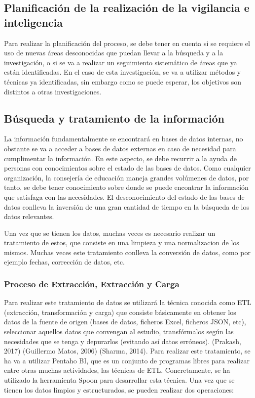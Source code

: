 \subsection{Planificación de la realización de la vigilancia e inteligencia}
Para realizar la planificación del proceso, se debe tener en cuenta si se requiere el uso de nuevas áreas desconocidas que puedan llevar a la búsqueda y a la investigación, o si se va a realizar un seguimiento sistemático de áreas que ya están identificadas. En el caso de esta investigación, se va a utilizar métodos y técnicas ya identificadas, sin embargo como se puede esperar, los objetivos son distintos a otras investigaciones.


\subsection{Búsqueda y tratamiento de la información}

La información fundamentalmente se encontrará en bases de datos internas, no obstante se va a acceder a bases de datos externas en caso de necesidad para cumplimentar la información. En este aspecto, se debe recurrir a la ayuda de personas con conocimientos sobre el estado de las bases de datos. Como cualquier organización, la consejería de educación maneja grandes volúmenes de datos, por tanto, se debe tener conocimiento sobre donde se puede encontrar la información que satisfaga con las necesidades. 
El desconocimiento del estado de las bases de datos conlleva la inversión de una gran cantidad de tiempo en la búsqueda de los datos relevantes. 

Una vez que se tienen los datos, muchas veces es necesario realizar un tratamiento de estos, que consiste en una limpieza y una normalizacion de los mismos. Muchas veces este tratamiento conlleva la conversión de datos, como por ejemplo fechas, corrección de datos, etc.

\subsubsection{Proceso de Extracción, Extracción y Carga}

Para realizar este tratamiento de datos se utilizará la técnica conocida como ETL (extracción, transformación y carga) que consiste básicamente en obtener los datos de la fuente de origen (bases de datos, ficheros Excel, ficheros JSON, etc), seleccionar aquellos datos que convengan al estudio, transfórmalos según las necesidades que se tenga y depurarlos (evitando así datos erróneos). (Prakash, 2017) (Guillermo Matos, 2006) (Sharma, 2014).
Para realizar este tratamiento, se ha va a utilizar Pentaho BI, que es un conjunto de programas libres para realizar entre otras muchas actividades, las técnicas de ETL. Concretamente, se ha utilizado la herramienta Spoon para desarrollar esta técnica. 
Una vez que se tienen los datos limpios y estructurados, se pueden realizar dos operaciones:


